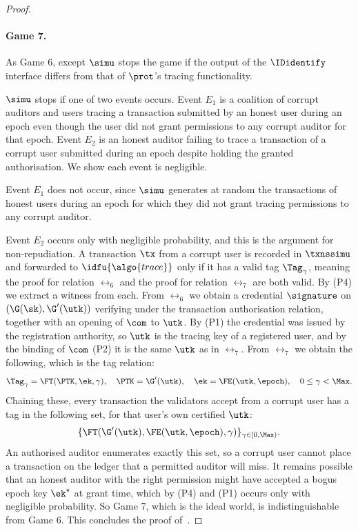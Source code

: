 \begin{proof}
\begin{description}
  \end{description}

  \paragraph{Game 7.} As Game 6, except $\simu$ stops the game if the output of
the $\IDidentify$ interface differs from that of $\prot$'s tracing
functionality.

  $\simu$ stops if one of two events occurs. Event $E_1$ is a coalition of
corrupt auditors and users tracing a transaction submitted by an honest user
during an epoch even though the user did not grant permissions to any corrupt
auditor for that epoch. Event $E_2$ is an honest auditor failing to trace a
transaction of a corrupt user submitted during an epoch despite holding the
granted authorisation. We show each event is negligible.

  Event $E_1$ does not occur, since $\simu$ generates at random the transactions
of honest users during an epoch for which they did not grant tracing
permissions to any corrupt auditor.

  Event $E_2$ occurs only with negligible probability, and this is the
argument for non-repudiation. A transaction $\tx$ from a
corrupt user is recorded in $\txnssimu$ and forwarded to $\idfu{\algo{trace}}$
only if it has a valid tag $\Tag_{\gamma}$, meaning the proof for relation
$\rel_6$ and the proof for relation $\rel_7$ are both valid. By (P4) we extract
a witness from each. From $\rel_6$ we obtain a credential $\signature$ on
$(\G(\sk), \G'(\utk))$ verifying under the transaction authorisation relation,
together with an opening of $\com$ to $\utk$. By (P1) the credential was issued
by the registration authority, so $\utk$ is the tracing key of a registered
user, and by the binding of $\com$ (P2) it is the same $\utk$ as in
$\rel_7$. From $\rel_7$ we obtain the following, which is the tag relation:
  \begin{equation*}
    \Tag_{\gamma} = \FT(\PTK, \ek, \gamma), \quad \PTK = \G'(\utk), \quad \ek
= \FE(\utk, \epoch), \quad 0 \leq \gamma < \Max.
  \end{equation*}
  Chaining these, every transaction the validators accept from a corrupt user
has a tag in the following set, for that user's own certified $\utk$:
  \begin{equation*}
    \{\FT(\G'(\utk),\FE(\utk,\epoch),\gamma)\}_{\gamma \in [0,\Max)}.
  \end{equation*}
  An authorised auditor enumerates exactly this set, so a corrupt user cannot
place a transaction on the ledger that a permitted auditor will miss. It remains
possible that an honest auditor with the right permission might have
accepted a bogus epoch key $\ek^\star$ at grant time, which by (P4) and (P1)
occurs only with negligible probability. So Game 7, which is the ideal world, is
indistinguishable from Game 6. This concludes the proof of~.

\end{proof}

